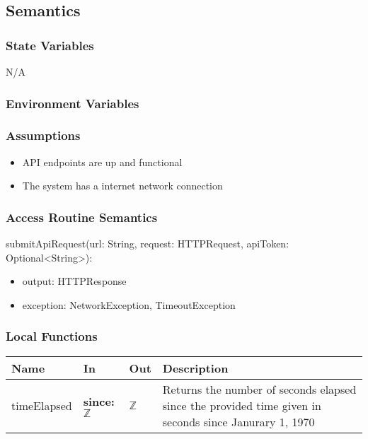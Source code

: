 \documentclass[12pt, titlepage]{article}
\begin{document}
\subsection{Semantics}

\subsubsection{State Variables}
N/A

\subsubsection{Environment Variables}

\subsubsection{Assumptions}
\begin{itemize}
  \item API endpoints are up and functional
  \item The system has a internet network connection
\end{itemize}
\subsubsection{Access Routine Semantics}

\noindent submitApiRequest(url: String, request: HTTPRequest, apiToken:
Optional\textless String\textgreater):
\begin{itemize}
  \item output: HTTPResponse
  \item exception: NetworkException, TimeoutException
\end{itemize}

\subsubsection{Local Functions}

\begin{center}
  \begin{tabular}{>{\raggedright}p{3cm} >{\raggedright}p{5cm}
    >{\raggedright}p{4cm} p{4cm}}
    \hline
    \textbf{Name} & \textbf{In} & \textbf{Out} & \textbf{Description} \\
    \hline
    timeElapsed & \textbf{since:} $\mathbb{Z}$ & $\mathbb{Z}$ & Returns the
    number of seconds elapsed since the provided time given in seconds since
    Janurary 1, 1970 \\
    \hline
  \end{tabular}
\end{center}
\end{document}
